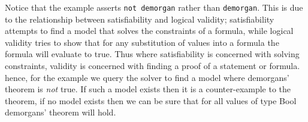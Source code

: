 Notice that the example asserts \lstinline{not demorgan} rather than
\lstinline{demorgan}. This is due to the relationship between satisfiability and
logical validity; satisfiability attempts to find a model that solves the
constraints of a formula, while logical validity tries to show that for any
substitution of values into a formula the formula will evaluate to true. Thus
where satisfiability is concerned with solving constraints, validity is
concerned with finding a proof of a statement or formula. hence, for the example
we query the solver to find a model where demorgans' theorem is \emph{not} true.
If such a model exists then it is a counter-example to the theorem, if no model
exists then we can be sure that for all values of type Bool demorgans' theorem
will hold.

%

